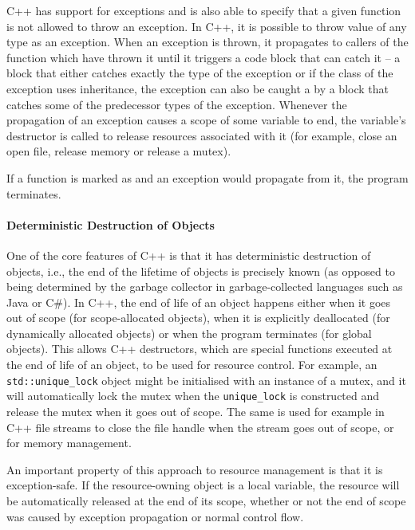 C++ has support for exceptions and is also able to specify that a given function
is not allowed to throw an exception.
In C++, it is possible to throw value of any type as an exception.
When an exception is thrown, it propagates to callers of the function which
have thrown it until it triggers a  code block that can catch it --
a  block that either catches exactly the type of the exception or
if the class of the exception uses inheritance, the exception can also be
caught a by a  block that catches some of the predecessor types of
the exception.
Whenever the propagation of an exception causes  a scope of some variable to end, the variable's destructor is called to release resources associated with it (for example, close an open file, release memory or release a mutex).

If a function is marked as  and an exception would propagate from
it, the program terminates.

\paragraph{Deterministic Destruction of Objects}

One of the core features of C++ is that it has deterministic destruction of objects, i.e., the end of the lifetime of objects is precisely known (as opposed to being determined by the garbage collector in garbage-collected languages such as Java or C\#).
In C++, the end of life of an object happens either when it goes out of scope (for scope-allocated objects), when it is explicitly deallocated (for dynamically allocated objects) or when the program terminates (for global objects).
This allows C++ destructors, which are special functions executed at the end of life of an object, to be used for resource control.
For example, an \texttt{std::unique\_lock} object might be initialised with an instance of a mutex, and it will automatically lock the mutex when the \texttt{unique\_lock} is constructed and release the mutex when it goes out of scope.
The same is used for example in C++ file streams to close the file handle when the stream goes out of scope, or for memory management.

An important property of this approach to resource management is that it is exception-safe.
If the resource-owning object is a local variable, the resource will be automatically released at the end of its scope, whether or not the end of scope was caused by exception propagation or normal control flow.


